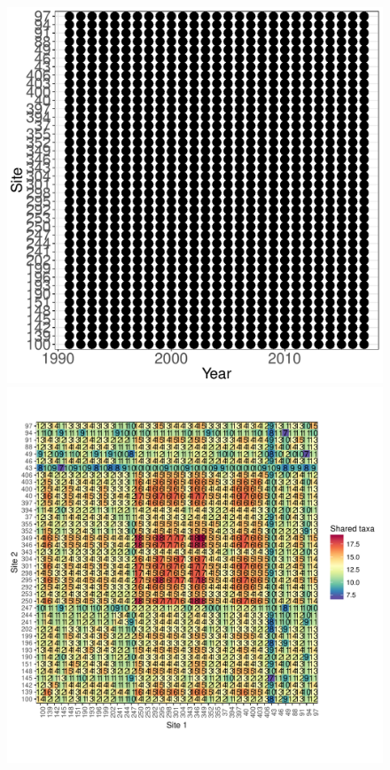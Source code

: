 \documentclass[11pt, oneside]{article}
\begin{document}
\begin{figure}[h!]
\includegraphics[scale = 0.4]{luq-snails-compagnoni_spatiotemporal_sampling_effort.pdf}
\includegraphics[scale = 0.4]{luq-snails-compagnoni_spp_shared.pdf}

\end{figure}
\end{document}
